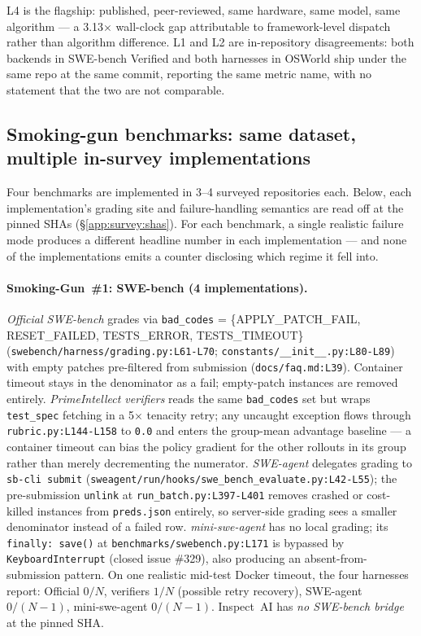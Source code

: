 \documentclass{article}
\begin{document}
L4 is the flagship: published, peer-reviewed, same hardware,
same model, same algorithm --- a 3.13$\times$ wall-clock gap
attributable to framework-level dispatch rather than algorithm
difference. L1 and L2 are in-repository disagreements: both
backends in SWE-bench Verified and both harnesses in OSWorld
ship under the same repo at the same commit, reporting the
same metric name, with no statement that the two are not
comparable.

\subsection{Smoking-gun benchmarks: same dataset, multiple in-survey implementations}
\label{app:vc:smoking}

Four benchmarks are implemented in 3--4 surveyed repositories
each. Below, each implementation's grading site and
failure-handling semantics are read off at the pinned SHAs
(\S\ref{app:survey:shas}). For each benchmark, a single
realistic failure mode produces a different headline number in
each implementation --- and none of the implementations emits
a counter disclosing which regime it fell into.

\paragraph{Smoking-Gun~\#1: SWE-bench (4 implementations).}
\emph{Official SWE-bench} grades via \texttt{bad\_codes} =
\{APPLY\_PATCH\_FAIL, RESET\_FAILED, TESTS\_ERROR,
TESTS\_TIMEOUT\}
(\texttt{swebench/harness/grading.py:L61-L70};
\texttt{constants/\_\_init\_\_.py:L80-L89}) with empty patches
pre-filtered from submission (\texttt{docs/faq.md:L39}). Container
timeout stays in the denominator as a fail; empty-patch
instances are removed entirely. \emph{PrimeIntellect verifiers}
reads the same \texttt{bad\_codes} set but wraps
\texttt{test\_spec} fetching in a 5$\times$ tenacity retry; any
uncaught exception flows through \texttt{rubric.py:L144-L158}
to \texttt{0.0} and enters the group-mean advantage baseline
--- a container timeout can bias the policy gradient for the
other rollouts in its group rather than merely decrementing
the numerator. \emph{SWE-agent} delegates grading to
\texttt{sb-cli submit}
(\texttt{sweagent/run/hooks/swe\_bench\_evaluate.py:L42-L55});
the pre-submission \texttt{unlink} at
\texttt{run\_batch.py:L397-L401} removes crashed or
cost-killed instances from \texttt{preds.json} entirely, so
server-side grading sees a smaller denominator instead of a
failed row. \emph{mini-swe-agent} has no local grading; its
\texttt{finally: save()} at
\texttt{benchmarks/swebench.py:L171} is bypassed by
\texttt{KeyboardInterrupt} (closed issue \#329), also
producing an absent-from-submission pattern. On one realistic
mid-test Docker timeout, the four harnesses report: Official
$0/N$, verifiers $1/N$ (possible retry recovery), SWE-agent
$0/(N-1)$, mini-swe-agent $0/(N-1)$. Inspect~AI has \emph{no
SWE-bench bridge} at the pinned SHA.
\end{document}
